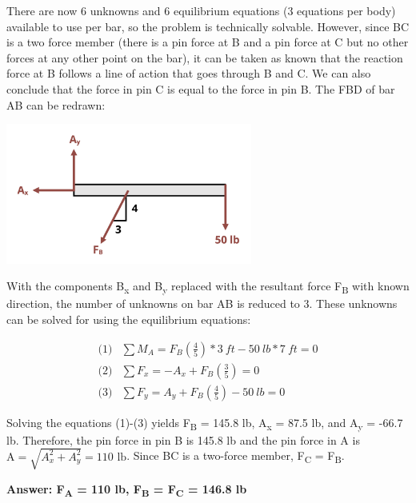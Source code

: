 \documentclass[
  letterpaper,
  DIV=11,
  numbers=noendperiod]{scrreprt}
\begin{document}
\begin{tcolorbox}
\begin{tcolorbox}
There are now 6 unknowns and 6 equilibrium equations (3 equations per
body) available to use per bar, so the problem is technically solvable.
However, since BC is a two force member (there is a pin force at B and a
pin force at C but no other forces at any other point on the bar), it
can be taken as known that the reaction force at B follows a line of
action that goes through B and C. We can also conclude that the force in
pin C is equal to the force in pin B. The FBD of bar AB can be redrawn:

\begin{center}
\includegraphics[width=3.1875in,height=\textheight]{images/CH1 PNGs/example 1.3 part 3.png}
\end{center}

With the components B\textsubscript{x} and B\textsubscript{y} replaced
with the resultant force F\textsubscript{B} with known direction, the
number of unknowns on bar AB is reduced to 3. These unknowns can be
solved for using the equilibrium equations:

\[
\begin{aligned}
\text{(1)} & \sum M_A=F_B\left(\frac{4}{5}\right)*3{~ft}-50{~lb}*7{~ft}=0 \\
\text{(2)} & \sum F_x=-A_x+F_B\left(\frac{3}{5}\right)=0 \\
\text{(3)} & \sum F_y=A_y+F_B\left(\frac{4}{5}\right)-50{~lb}=0
\end{aligned}
\]

Solving the equations (1)-(3) yields F\textsubscript{B} = 145.8 lb,
A\textsubscript{x} = 87.5 lb, and A\textsubscript{y} = -66.7 lb.
Therefore, the pin force in pin B is 145.8 lb and the pin force in A is
\(\mathrm{A}=\sqrt{A_x^2+A_y^2}=110 \text{ lb}\). Since BC is a
two-force member, F\textsubscript{C} = F\textsubscript{B}.

\textbf{Answer: F\textsubscript{A} = 110 lb, F\textsubscript{B} =
F\textsubscript{C} = 146.8 lb}

\end{tcolorbox}

\end{tcolorbox}
\end{document}
